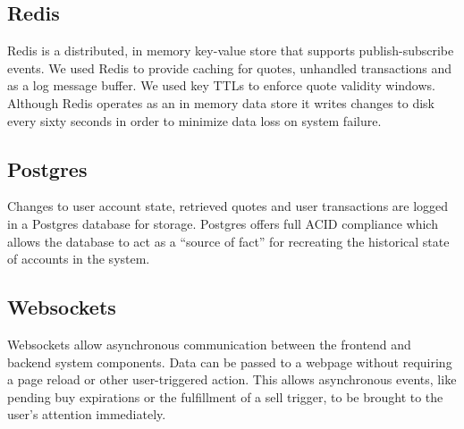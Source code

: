 \subsection{Redis}
Redis is a distributed, in memory key-value store that supports publish-subscribe events. We used Redis to provide caching for quotes, unhandled transactions and as a log message buffer. We used key TTLs to enforce quote validity windows. Although Redis operates as an in memory data store it writes changes to disk every sixty seconds in order to minimize data loss on system failure.

\subsection{Postgres}
Changes to user account state, retrieved quotes and user transactions are logged in a Postgres database for storage. Postgres offers full ACID compliance which allows the database to act as a ``source of fact'' for recreating the historical state of accounts in the system.

\subsection{Websockets} 
Websockets allow asynchronous communication between the frontend and backend system components. Data can be passed to a webpage without requiring a page reload or other user-triggered action. This allows asynchronous events, like pending buy expirations or the fulfillment of a sell trigger, to be brought to the user's attention immediately.
